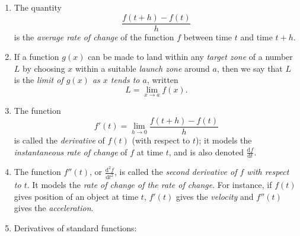 \documentclass{article}
\newcommand{\deriv}[3][]{\frac{\mathrm{d}^{#1} #2}{\mathrm{d}#3^{#1}}}
\begin{document}
\begin{enumerate}
	\item The quantity
		\[\frac{f(t+h)-f(t)}{h}\]
		is the \textit{average rate of change} of the function $f$ between time $t$ and time $t+h$.
	\item If a function $g(x)$ can be made to land within any \textit{target zone} of a number $L$ by choosing $x$ within a suitable \textit{launch zone} around $a$, then we say that $L$ is the \textit{limit of $g(x)$ as $x$ tends to $a$}, written
		\[L=\lim_{x\to a}f(x).\]
	\item The function
		\[f'(t)=\lim_{h\to 0}\frac{f(t+h)-f(t)}{h}\]
		is called the \textit{derivative} of $f(t)$ (with respect to $t$); it models the \textit{instantaneous rate of change} of $f$ at time $t$, and is also denoted $\deriv{f}{t}$.
	\item The function $f''(t)$, or $\deriv[2]{f}{t}$, is called the \textit{second derivative of $f$ with respect to $t$}. It models the \textit{rate of change of the rate of change}. For instance, if $f(t)$ gives position of an object at time $t$, $f'(t)$ gives the \textit{velocity} and $f''(t)$ gives the \textit{acceleration}.
	\item Derivatives of standard functions:


\end{enumerate}
\end{document}
